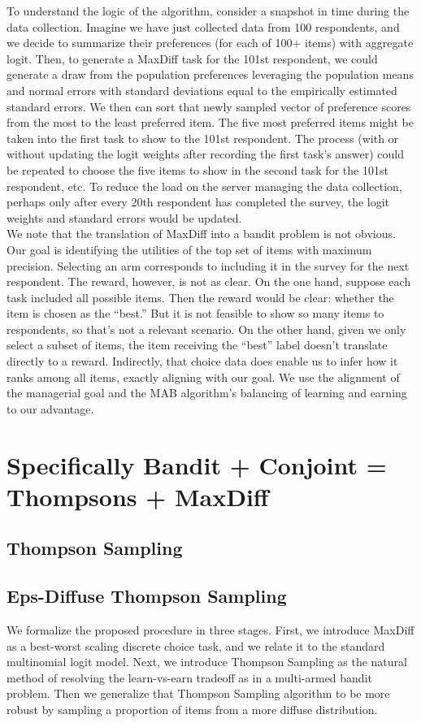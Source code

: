 \documentclass[mksc,blindrev]{informs3} %
\begin{document}
To understand the logic of the algorithm, consider a snapshot in time during the data collection. Imagine we have just collected data from 100 respondents, and we decide to summarize their preferences (for each of 100+ items) with aggregate logit.  Then, to generate a MaxDiff task for the 101st respondent, we could generate a draw from the population preferences leveraging the population means and normal errors with standard deviations equal to the empirically estimated standard errors.  We then can sort that newly sampled vector of preference scores from the most to the least preferred item.  The five most preferred items might be taken into the first task to show to the 101st respondent.  The process (with or without updating the logit weights after recording the first task’s answer) could be repeated to choose the five items to show in the second task for the 101st respondent, etc.  To reduce the load on the server managing the data collection, perhaps only after every 20th respondent has completed the survey, the logit weights and standard errors would be updated.\\
We note that the translation of MaxDiff into a bandit problem is not obvious. Our goal is identifying the utilities of the top set of items with maximum precision. Selecting an arm corresponds to including it in the survey for the next respondent. The reward, however, is not as clear. On the one hand, suppose each task included all possible items. Then the reward would be clear: whether the item is chosen as the “best.” But it is not feasible to show so many items to respondents, so that’s not a relevant scenario. On the other hand, given we only select a subset of items, the item receiving the “best” label doesn’t translate directly to a reward. Indirectly, that choice data does enable us to infer how it ranks among all items, exactly aligning with our goal. We use the alignment of the managerial goal and the MAB algorithm’s balancing of learning and earning to our advantage. \\
\section{Specifically Bandit + Conjoint = Thompsons + MaxDiff}
\subsection{Thompson Sampling}
\subsection{Eps-Diffuse Thompson Sampling}
We formalize the proposed procedure in three stages. First, we introduce MaxDiff as a best-worst scaling discrete choice task, and we relate it to the standard multinomial logit model. Next, we introduce Thompson Sampling as the natural method of resolving the learn-vs-earn tradeoff as in a multi-armed bandit problem.  Then we generalize that Thompson Sampling algorithm to be more robust by sampling a proportion of items from a more diffuse distribution.
\end{document}
